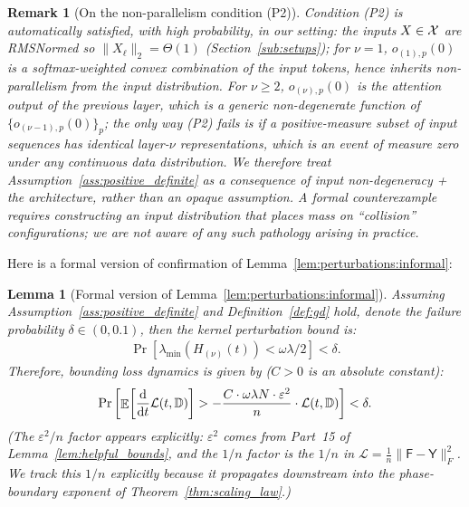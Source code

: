 \documentclass[11pt]{article}
\theoremstyle{plain}
\newtheorem{lemma}[theorem]{Lemma}
\newtheorem{remark}[theorem]{Remark}
\renewcommand{\d}{\mathrm{d}}
\DeclareMathOperator*{\E}{{\mathbb{E}}}
\begin{document}
\begin{remark}[On the non-parallelism condition (P2)]\label{rem:p2_non_parallel}
Condition (P2) is automatically satisfied, with high probability, in our setting: the inputs $X\in {\cal X}$ are RMSNormed so $\|X_\ell\|_2=\Theta(1)$ (Section~\ref{sub:setups}); for $\nu=1$, $o_{(1),p}(0)$ is a softmax-weighted convex combination of the input tokens, hence inherits non-parallelism from the input distribution. For $\nu\ge 2$, $o_{(\nu),p}(0)$ is the attention output of the previous layer, which is a generic non-degenerate function of $\{o_{(\nu-1),p}(0)\}_p$; the only way (P2) fails is if a positive-measure subset of input sequences has identical layer-$\nu$ representations, which is an event of measure zero under any continuous data distribution. We therefore treat Assumption~\ref{ass:positive_definite} as a {\it consequence} of input non-degeneracy + the architecture, rather than an opaque assumption. A formal counterexample requires constructing an input distribution that places mass on ``collision'' configurations; we are not aware of any such pathology arising in practice.
\end{remark}

Here is a formal version of confirmation of Lemma~\ref{lem:perturbations:informal}:
\begin{lemma}[Formal version of Lemma~\ref{lem:perturbations:informal}]\label{lem:perturbations}
    Assuming Assumption~\ref{ass:positive_definite} and Definition~\ref{def:gd} hold, denote the failure probability $\delta \in (0, 0.1)$, then the kernel perturbation bound is:
    \begin{align*}
        \Pr\left[\lambda_{\min}(H_{(\nu)}(t)) < \omega\lambda  /2\right] < \delta.
    \end{align*}
    Therefore, bounding loss dynamics is given by ($C > 0$ is an absolute constant):
    \begin{align*}
        \Pr\left[\E\!\left[\frac{\d }{\d t}{\cal L}(t, \mathbb{D})\right] > - \frac{C \cdot \omega\lambda N \cdot \varepsilon^2}{n} \cdot {\cal L}(t, \mathbb{D})\right] < \delta.
    \end{align*}
    {\it (The $\varepsilon^2/n$ factor appears explicitly: $\varepsilon^2$ comes from Part~15 of Lemma~\ref{lem:helpful_bounds}, and the $1/n$ factor is the $1/n$ in $\mathcal{L} = \frac{1}{n}\|\mathsf{F}-\mathsf{Y}\|_F^2$. We track this $1/n$ explicitly because it propagates downstream into the phase-boundary exponent of Theorem~\ref{thm:scaling_law}.)}
\end{lemma}
\end{document}
